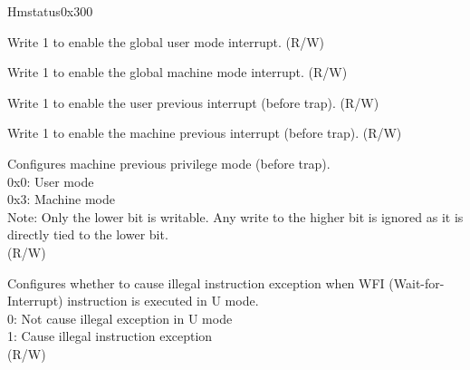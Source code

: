\begin{register}{H}{mstatus}{0x300}\label{regdesc:MSTATUS}
%
%
%
%
%
%
%
%
%
%
%
\regnewline%
\begin{regdesc}\begin{reglist}
\label{fielddesc:MSTATUSUIE}\item [UIE] Write 1 to enable the global user mode interrupt. (R/W)
\label{fielddesc:MSTATUSMIE}\item [MIE] Write 1 to enable the global machine mode interrupt. (R/W)
\label{fielddesc:MSTATUSUPIE}\item [UPIE] Write 1 to enable the user previous interrupt (before trap). (R/W)
\label{fielddesc:MSTATUSMPIE}\item [MPIE] Write 1 to enable the machine previous interrupt (before trap). (R/W)
\label{fielddesc:MSTATUSMPP}\item [MPP] Configures machine previous privilege mode (before trap).\\
0x0: User mode\\
0x3: Machine mode\\
Note: Only the lower bit is writable. Any write to the higher bit is ignored as it is directly tied to the lower bit.\\
(R/W)
\label{fielddesc:MSTATUSTW}\item [TW] Configures whether to cause illegal instruction exception when WFI (Wait-for-Interrupt) instruction is executed in U mode. \\
0: Not cause illegal exception in U mode\\
1: Cause illegal instruction exception\\
(R/W)
\end{reglist}\end{regdesc}
\end{register}

